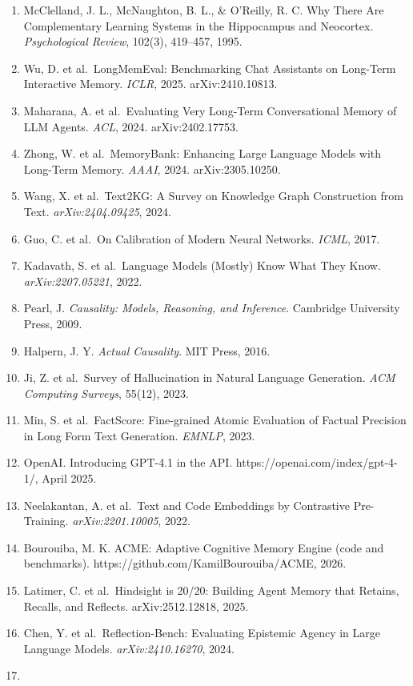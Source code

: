 \documentclass[11pt,a4paper]{article}
\begin{document}
\begin{enumerate}
\item
  McClelland, J. L., McNaughton, B. L., \& O'Reilly, R. C. Why There Are
  Complementary Learning Systems in the Hippocampus and Neocortex.
  \emph{Psychological Review}, 102(3), 419--457, 1995.
\item
  Wu, D. et al.~LongMemEval: Benchmarking Chat Assistants on Long-Term
  Interactive Memory. \emph{ICLR}, 2025. arXiv:2410.10813.
\item
  Maharana, A. et al.~Evaluating Very Long-Term Conversational Memory of
  LLM Agents. \emph{ACL}, 2024. arXiv:2402.17753.
\item
  Zhong, W. et al.~MemoryBank: Enhancing Large Language Models with
  Long-Term Memory. \emph{AAAI}, 2024. arXiv:2305.10250.
\item
  Wang, X. et al.~Text2KG: A Survey on Knowledge Graph Construction from
  Text. \emph{arXiv:2404.09425}, 2024.
\item
  Guo, C. et al.~On Calibration of Modern Neural Networks. \emph{ICML},
  2017.
\item
  Kadavath, S. et al.~Language Models (Mostly) Know What They Know.
  \emph{arXiv:2207.05221}, 2022.
\item
  Pearl, J. \emph{Causality: Models, Reasoning, and Inference}.
  Cambridge University Press, 2009.
\item
  Halpern, J. Y. \emph{Actual Causality}. MIT Press, 2016.
\item
  Ji, Z. et al.~Survey of Hallucination in Natural Language Generation.
  \emph{ACM Computing Surveys}, 55(12), 2023.
\item
  Min, S. et al.~FactScore: Fine-grained Atomic Evaluation of Factual
  Precision in Long Form Text Generation. \emph{EMNLP}, 2023.
\item
  OpenAI. Introducing GPT-4.1 in the API.
  https://openai.com/index/gpt-4-1/, April 2025.
\item
  Neelakantan, A. et al.~Text and Code Embeddings by Contrastive
  Pre-Training. \emph{arXiv:2201.10005}, 2022.
\item
  Bourouiba, M. K. ACME: Adaptive Cognitive Memory Engine (code and
  benchmarks). https://github.com/KamilBourouiba/ACME, 2026.
\item
  Latimer, C. et al.~Hindsight is 20/20: Building Agent Memory that
  Retains, Recalls, and Reflects. arXiv:2512.12818, 2025.
\item
  Chen, Y. et al.~Reflection-Bench: Evaluating Epistemic Agency in Large
  Language Models. \emph{arXiv:2410.16270}, 2024.
\item

\end{enumerate}
\end{document}
